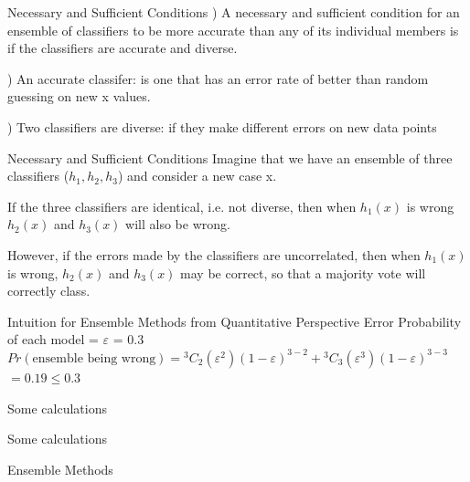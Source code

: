 \documentclass{beamer}
\newcommand*{\Comb}[2]{{}^{#1}C_{#2}}%
\begin{document}
\begin{frame}{Necessary and Sufficient Conditions}
  ) A necessary and sufficient condition for an ensemble of classifiers to be more
  accurate than any of its individual members is if the classifiers are accurate and
  diverse.

  ) An accurate classifer: \pause  is one that has an
  error rate of better than random guessing on new x values.

  ) Two classifiers are diverse: \pause  if they make different errors on new data points

\end{frame}

\begin{frame}{Necessary and Sufficient Conditions}
  Imagine that we have an ensemble of three classifiers ($h_1, h_2, h_3$) and consider a new case x.


  \pause If the three classifiers are identical, i.e.
  not diverse, then when $h_1(x)$ is wrong $h_2(x)$ and $h_3(x)$ will also be wrong.


  \pause However, if the errors made by the classifiers are uncorrelated, then when $h_1(x)$
  is wrong, $h_2(x)$ and $h_3(x)$ may be correct, so that a majority vote will correctly
  class.

\end{frame}
\begin{frame}{Intuition for Ensemble Methods from Quantitative Perspective}
  \pause Error Probability of each model = $\varepsilon$ = 0.3\\
  \vspace{1cm}
  $Pr(\text{ensemble being wrong}) = \Comb{3}{2}(\varepsilon^2)(1-\varepsilon)^{3-2} + \Comb{3}{3}(\varepsilon^3)(1-\varepsilon)^{3-3}$\\
  \vspace{0.5cm}
  \hspace{4.4cm}$ = 0.19 \leq 0.3$
\end{frame}

\begin{frame}{Some calculations}
  
\end{frame}

\begin{frame}{Some calculations}
  
\end{frame}
\begin{frame}{Ensemble Methods}
\end{frame}
\end{document}
